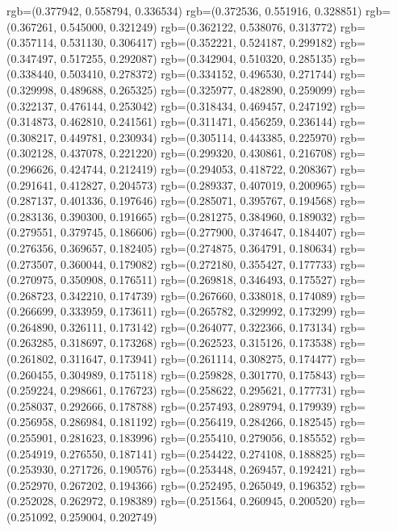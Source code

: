 {{{					rgb=(0.377942, 0.558794, 0.336534)
					rgb=(0.372536, 0.551916, 0.328851)
					rgb=(0.367261, 0.545000, 0.321249)
					rgb=(0.362122, 0.538076, 0.313772)
					rgb=(0.357114, 0.531130, 0.306417)
					rgb=(0.352221, 0.524187, 0.299182)
					rgb=(0.347497, 0.517255, 0.292087)
					rgb=(0.342904, 0.510320, 0.285135)
					rgb=(0.338440, 0.503410, 0.278372)
					rgb=(0.334152, 0.496530, 0.271744)
					rgb=(0.329998, 0.489688, 0.265325)
					rgb=(0.325977, 0.482890, 0.259099)
					rgb=(0.322137, 0.476144, 0.253042)
					rgb=(0.318434, 0.469457, 0.247192)
					rgb=(0.314873, 0.462810, 0.241561)
					rgb=(0.311471, 0.456259, 0.236144)
					rgb=(0.308217, 0.449781, 0.230934)
					rgb=(0.305114, 0.443385, 0.225970)
					rgb=(0.302128, 0.437078, 0.221220)
					rgb=(0.299320, 0.430861, 0.216708)
					rgb=(0.296626, 0.424744, 0.212419)
					rgb=(0.294053, 0.418722, 0.208367)
					rgb=(0.291641, 0.412827, 0.204573)
					rgb=(0.289337, 0.407019, 0.200965)
					rgb=(0.287137, 0.401336, 0.197646)
					rgb=(0.285071, 0.395767, 0.194568)
					rgb=(0.283136, 0.390300, 0.191665)
					rgb=(0.281275, 0.384960, 0.189032)
					rgb=(0.279551, 0.379745, 0.186606)
					rgb=(0.277900, 0.374647, 0.184407)
					rgb=(0.276356, 0.369657, 0.182405)
					rgb=(0.274875, 0.364791, 0.180634)
					rgb=(0.273507, 0.360044, 0.179082)
					rgb=(0.272180, 0.355427, 0.177733)
					rgb=(0.270975, 0.350908, 0.176511)
					rgb=(0.269818, 0.346493, 0.175527)
					rgb=(0.268723, 0.342210, 0.174739)
					rgb=(0.267660, 0.338018, 0.174089)
					rgb=(0.266699, 0.333959, 0.173611)
					rgb=(0.265782, 0.329992, 0.173299)
					rgb=(0.264890, 0.326111, 0.173142)
					rgb=(0.264077, 0.322366, 0.173134)
					rgb=(0.263285, 0.318697, 0.173268)
					rgb=(0.262523, 0.315126, 0.173538)
					rgb=(0.261802, 0.311647, 0.173941)
					rgb=(0.261114, 0.308275, 0.174477)
					rgb=(0.260455, 0.304989, 0.175118)
					rgb=(0.259828, 0.301770, 0.175843)
					rgb=(0.259224, 0.298661, 0.176723)
					rgb=(0.258622, 0.295621, 0.177731)
					rgb=(0.258037, 0.292666, 0.178788)
					rgb=(0.257493, 0.289794, 0.179939)
					rgb=(0.256958, 0.286984, 0.181192)
					rgb=(0.256419, 0.284266, 0.182545)
					rgb=(0.255901, 0.281623, 0.183996)
					rgb=(0.255410, 0.279056, 0.185552)
					rgb=(0.254919, 0.276550, 0.187141)
					rgb=(0.254422, 0.274108, 0.188825)
					rgb=(0.253930, 0.271726, 0.190576)
					rgb=(0.253448, 0.269457, 0.192421)
					rgb=(0.252970, 0.267202, 0.194366)
					rgb=(0.252495, 0.265049, 0.196352)
					rgb=(0.252028, 0.262972, 0.198389)
					rgb=(0.251564, 0.260945, 0.200520)
					rgb=(0.251092, 0.259004, 0.202749)
}}}
